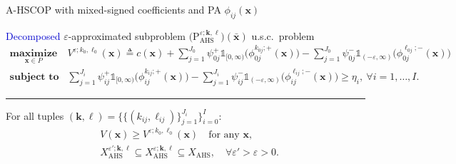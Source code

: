 \documentclass[aspectratio=169,xcolor=dvipsnames]{beamer}
\begin{document}
\begin{frame}{A-HSCOP with mixed-signed coefficients and PA $\phi_{ij}(\mathbf{x})$}
  \scriptsize
  \setlength{\abovedisplayskip}{3pt}
  \setlength{\belowdisplayskip}{3pt}

  \textcolor{MediumBlue}{Decomposed} $\varepsilon$-approximated subproblem
  $\bigl(\mathrm{P}^{\varepsilon;\mathbf{k},\ell}_{\mathrm{AHS}}\bigr)
  (\bar{\mathbf{x}})$ u.s.c.\ problem
  \[
    \begin{aligned}
      \operatorname*{\textbf{maximize}}_{\mathbf{x}\in P}\
      &V^{\varepsilon;k_0,\ell_0}(\mathbf{x})\triangleq c(\mathbf{x})
        +\sum_{j=1}^{J_0}\psi^+_{0j}\mathds{1}_{[0,\infty)}
          \bigl(\phi^{k_{0j};+}_{0j}(\mathbf{x})\bigr)
        -\sum_{j=1}^{J_0}\psi^-_{0j}\mathds{1}_{(-\varepsilon,\infty)}
          \bigl(\phi^{\ell_{0j};-}_{0j}(\mathbf{x})\bigr)\\
      \operatorname*{\textbf{subject to}}\
      &\sum_{j=1}^{J_i}\psi^+_{ij}\mathds{1}_{[0,\infty)}
          \bigl(\phi^{k_{ij};+}_{ij}(\mathbf{x})\bigr)
        -\sum_{j=1}^{J_i}\psi^-_{ij}\mathds{1}_{(-\varepsilon,\infty)}
          \bigl(\phi^{\ell_{ij};-}_{ij}(\mathbf{x})\bigr)\geq\eta_i,\
          \forall i=1,\ldots,I.
    \end{aligned}
  \]

  \vspace{-0.02cm}
  {\color{MediumBlack}\rule{\linewidth}{0.4pt}}

  For all tuples $(\mathbf{k},\ell)=\bigl\{\{(k_{ij},\ell_{ij})\}_{j=1}^{J_i}
  \bigr\}_{i=0}^{I}$:
  \[
    \begin{aligned}
      &V(\mathbf{x})\geq V^{\varepsilon;k_0,\ell_0}(\mathbf{x})\quad
        \text{for any }\mathbf{x},\\
      &X^{\varepsilon';\mathbf{k},\ell}_{\mathrm{AHS}}\subseteq
        X^{\varepsilon;\mathbf{k},\ell}_{\mathrm{AHS}}\subseteq
        X_{\mathrm{AHS}},\quad\forall\varepsilon'>\varepsilon>0.
    \end{aligned}
  \]
\end{frame}
\end{document}
